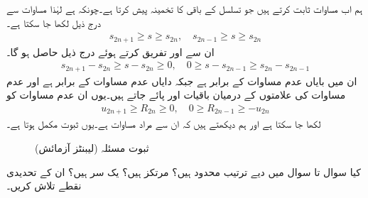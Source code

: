 ہم اب مساوات  ثابت کرتے ہیں جو تسلسل کے باقی کا تخمینہ پیش کرتا ہے۔چونکہ  ہے  لہٰذا مساوات  سے درج ذیل لکھا جا سکتا ہے۔
\begin{align*}
s_{2n+1}\ge s\ge s_{2n},\quad s_{2n-1}\ge s\ge s_{2n} 
\end{align*}
ان سے  اور  تفریق کرتے ہوئے درج ذیل حاصل ہو گا۔
\begin{align*}
s_{2n+1}-s_{2n}\ge s-s_{2n}\ge 0,\quad 0\ge s-s_{2n-1}\ge s_{2n}-s_{2n-1}
\end{align*}
ان میں بایاں عدم مساوات  کے برابر ہے جبکہ دایاں عدم مساوات  کے برابر ہے  اور عدم مساوات کی علامتوں کے درمیان باقیات  اور  پائے جاتے ہیں۔یوں ان عدم مساوات کو
\begin{align*}
u_{2n+1}\ge R_{2n}\ge 0,\quad 0\ge R_{2n-1}\ge -u_{2n}
\end{align*}  
لکھا جا سکتا ہے اور ہم دیکھتے ہیں کہ ان سے مراد مساوات  ہے۔یوں ثبوت مکمل ہوتا ہے۔
\begin{figure}
\centering
{}
\caption{ثبوت مسئلہ  (لیبنٹز آزمائش)}
\label{شکل_مسئلہ_ترتیب_آزمائش_لیبنٹز}
\end{figure}

کیا سوال  تا سوال  میں دیے ترتیب محدود ہیں؟ مرتکز ہیں؟ یک سر ہیں؟ ان کے تحدیدی نقطے تلاش کریں۔ 


